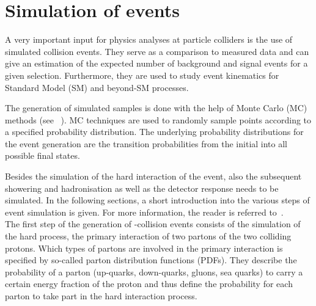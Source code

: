 


\FloatBarrier
\chapter{Simulation of events}
\label{ch:SimulationOfEvents}

A very important input for physics analyses at particle colliders is the use of simulated collision events.
They serve as a comparison to measured data and can give an estimation of the expected number of background and signal events for a given selection.
Furthermore, they are used to study event kinematics for Standard Model (SM) and beyond-SM processes.

The generation of simulated samples is done with the help of Monte Carlo (MC) methods (see \eg~\cite{bib:MC_Introduction}).
MC techniques are used to randomly sample points according to a specified probability distribution.
The underlying probability distributions for the event generation are the transition probabilities from the initial into all possible final states.

Besides the simulation of the hard interaction of the event, also the subsequent showering and hadronisation as well as the detector response needs to be simulated.
In the following sections, a short introduction into the various steps of event simulation is given.
For more information, the reader is referred to~\cite{bib:Matthias_Thesis}.\\

The first step of the generation of \pp-collision events consists of the simulation of the hard process, \ie the primary interaction of two partons of the two colliding protons.
Which types of partons are involved in the primary interaction is specified by so-called parton distribution functions (PDFs).
They describe the probability of a parton (up-quarks, down-quarks, gluons, sea quarks) to carry a certain energy fraction of the proton and thus define the probability for each parton to take part in the hard interaction process.

